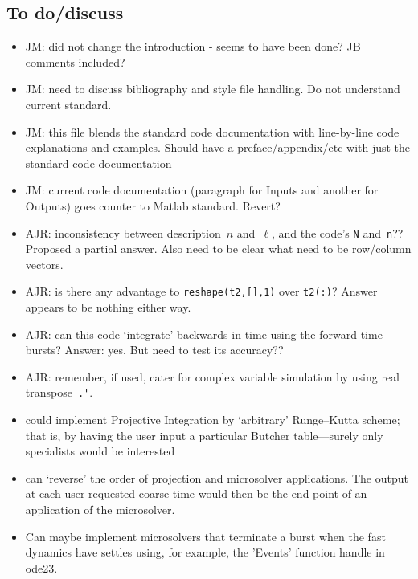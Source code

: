 \subsection{To do/discuss}
\begin{itemize}
\item JM: did not change the introduction - seems to have been done? JB comments included?
\item JM: need to discuss bibliography and style file handling. Do not understand current standard.
\item JM: this file blends the standard code documentation with line-by-line code explanations and examples. Should have a preface/appendix/etc with just the standard code documentation
\item JM: current code documentation (paragraph for Inputs and another for Outputs) goes counter to Matlab standard. Revert?
\item AJR: inconsistency between description~\(n\) and~\(\ell\), and the code's \verb|N| and~\verb|n|??  Proposed a partial answer.  Also need to be clear what need to be row/column vectors.
\item AJR: is there any advantage to \verb|reshape(t2,[],1)| over \verb|t2(:)|?  Answer appears to be nothing either way.
\item AJR: can this code `integrate' backwards in time using the forward time bursts? Answer: yes. But need to test its accuracy??
\item AJR: remember, if used, cater for complex variable simulation by using real transpose~\verb|.'|.
\item could implement Projective Integration by `arbitrary' Runge--Kutta scheme; that is, by having the user input a particular Butcher table---surely only specialists would be interested
\item can `reverse' the order of projection and microsolver applications.
The output at each user-requested coarse time would then be the end point of an application of the microsolver.
\item Can maybe implement microsolvers that terminate a burst when the fast dynamics have settles using, for example, the 'Events' function handle in ode23. 
\end{itemize}

